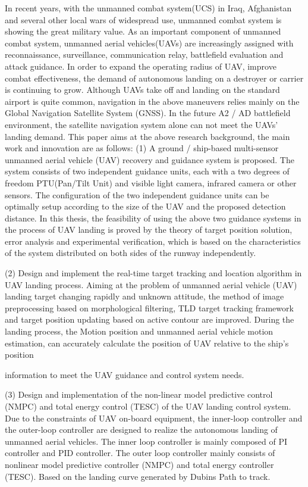 \begin{eabstract}
 In recent years, with the unmanned combat system(UCS) in Iraq, Afghanistan and several other local wars of widespread use, unmanned combat system is showing the great military value. As an important component of unmanned combat system, unmanned aerial vehicles(UAVs) are increasingly assigned with reconnaissance, surveillance, communication relay, battlefield evaluation and attack guidance. In order to expand the operating radius of UAV, improve combat effectiveness, the demand of autonomous landing on a destroyer or carrier is continuing to grow. Although UAVs take off and landing on the standard airport is quite common, navigation in the above maneuvers relies mainly on the Global Navigation Satellite System (GNSS). In the future A2 / AD battlefield environment, the satellite navigation system alone can not meet the UAVs' landing demand. This paper aims at the above research background, the main work and innovation are as follows:
(1) A ground / ship-based multi-sensor unmanned aerial vehicle (UAV) recovery and guidance system is proposed. The system consists of two independent guidance units, each with a two degrees of freedom PTU(Pan/Tilt Unit) and visible light camera, infrared camera or other sensors. The configuration of the two independent guidance units can be optimally setup according to the size of the UAV and the proposed detection distance. In this thesis, the feasibility of using the above two guidance systems in the process of UAV landing is proved by the theory of target position solution, error analysis and experimental verification, which is based on the characteristics of the system distributed on both sides of the runway independently.

(2) Design and implement the real-time target tracking and location algorithm in UAV landing process. Aiming at the problem of unmanned aerial vehicle (UAV) landing target changing rapidly and unknown attitude, the method of image preprocessing based on morphological filtering, TLD target tracking framework and target position updating based on active contour are improved. During the landing process, the Motion position and unmanned aerial vehicle motion estimation, can accurately calculate the position of UAV relative to the ship's position 

information to meet the UAV guidance and control system needs.

(3) Design and implementation of the non-linear model predictive control (NMPC) and total energy control (TESC) of the UAV landing control system. Due to the constraints of UAV on-board equipment, the inner-loop controller and the outer-loop controller are designed to realize the autonomous landing of unmanned aerial vehicles. The inner loop controller is mainly composed of PI controller and PID controller. The outer loop controller mainly consists of nonlinear model predictive controller (NMPC) and total energy controller (TESC). Based on the landing curve generated by Dubins Path to track.


\end{eabstract}
